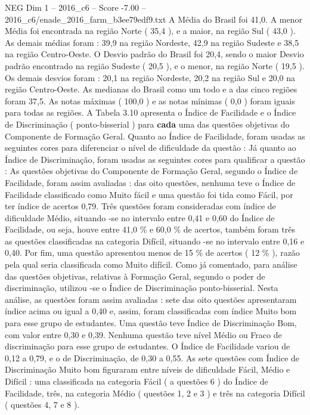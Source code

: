 \begin{textsample}{NEG Dim 1 – 2016\_c6 – Score -7.00 – 2016\_c6/enade\_2016\_farm\_b3ee79edf9.txt}
A Média do Brasil foi 41,0.
A menor Média foi encontrada na região Norte ( 35,4 ), e a maior, na região Sul ( 43,0 ).
As demais médias foram : 39,9 na região Nordeste, 42,9 na região Sudeste e 38,5 na região Centro-Oeste.
O Desvio padrão do Brasil foi 20,4, sendo o maior Desvio padrão encontrado na região Sudeste ( 20,5 ), e o menor, na região Norte ( 19,5 ).
Os demais desvios foram : 20,1 na região Nordeste, 20,2 na região Sul e 20,0 na região Centro-Oeste.
As medianas do Brasil como um todo e a das cinco regiões foram 37,5.
As notas máximas ( 100,0 ) e as notas mínimas ( 0,0 ) foram iguais para todas as regiões.
A Tabela 3.10 apresenta o Índice de Facilidade e o Índice de Discriminação ( ponto-bisserial ) para \textbf{cada} uma das questões objetivas do Componente de Formação Geral.
Quanto ao Índice de Facilidade, foram usadas as seguintes cores para diferenciar o nível de dificuldade da questão : Já quanto ao Índice de Discriminação, foram usadas as seguintes cores para qualificar a questão : As questões objetivas do Componente de Formação Geral, segundo o Índice de Facilidade, foram assim avaliadas : das oito questões, nenhuma teve o Índice de Facilidade classificado como Muito fácil e uma questão foi tida como Fácil, por ter índice de acertos 0,79.
Três questões foram consideradas com índice de dificuldade Médio, situando -se no intervalo entre 0,41 e 0,60 do Índice de Facilidade, ou seja, houve entre 41,0 \% e 60,0 \% de acertos, também foram três as questões classificadas na categoria Difícil, situando -se no intervalo entre 0,16 e 0,40.
Por fim, uma questão apresentou menos de 15 \% de acertos ( 12 \% ), razão pela qual seria classificada como Muito difícil.
Como já comentado, para análise das questões objetivas, relativas à Formação Geral, segundo o poder de discriminação, utilizou -se o Índice de Discriminação ponto-bisserial.
Nesta análise, as questões foram assim avaliadas : sete das oito questões apresentaram índice acima ou igual a 0,40 e, assim, foram classificadas com índice Muito bom para esse grupo de estudantes.
Uma questão teve Índice de Discriminação Bom, com valor entre 0,30 e 0,39.
Nenhuma questão teve nível Médio ou Fraco de discriminação para esse grupo de estudantes.
O Índice de Facilidade variou de 0,12 a 0,79, e o de Discriminação, de 0,30 a 0,55.
As sete questões com Índice de Discriminação Muito bom figuraram entre níveis de dificuldade Fácil, Médio e Difícil : uma classificada na categoria Fácil ( a questões 6 ) do Índice de Facilidade, três, na categoria Médio ( questões 1, 2 e 3 ) e três na categoria Difícil ( questões 4, 7 e 8 ).

\end{textsample}

